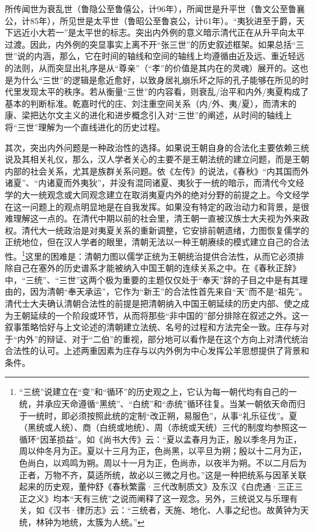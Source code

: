 \documentclass[a4paper, 12pt, openright]{ctexbook}
\begin{document}
所传闻世为衰乱世（鲁隐公至鲁僖公，计96年），所闻世是升平世（鲁文公至鲁襄公，计85年），所见世是太平世（鲁昭公至鲁哀公，计61年）。“夷狄进至于爵，天下远近小大若一”是太平世的标志。突出内外例的意义暗示清代正在从升平向太平过渡。因此，内外例的突显事实上离不开“张三世”的历史叙述框架。如果总括“三世”说的内涵，那么，它在时间的轴线和空间的轴线上均遵循由近及远、重近轻远的法则，从而突显出礼序是从“尊亲”（“孝”的价值是其内在的灵魂）展开的。这也是为什么“三世”的逻辑是愈近愈好，以致身居礼崩乐坏之际的孔子能够在所见的时代里发现太平的秩序。若从衡量“三世”的内容看，则衰乱/治平和内外/夷夏构成了基本的判断标准。乾嘉时代的庄、刘注重空间关系（内/外、夷/夏），而清末的康、梁把达尔文主义的进化和进步概念引入对“三世”的阐述，从时间的轴线上将“三世”理解为一个直线进化的历史过程。

其次，突出内外问题是一种政治性的选择。如果说王朝自身的合法化主要依赖三统说及其相关礼仪，那么，汉人学者关心的主要不是王朝法统的建立问题，而是王朝内部的社会关系，尤其是族群关系问题。依《左传》的说法，《春秋》“内其国而外诸夏”、“内诸夏而外夷狄”，并没有混同诸夏、夷狄于一统的暗示，而清代今文经学的大一统观念或大同观念建立在取消夷夏内外的绝对分野的前提之上。今文经学在这一问题上的观点明显地是在自我发挥。如果没有特定的政治动力和背景，是很难理解这一点的。在清代中期以前的社会里，清王朝一直被汉族士大夫视为外来政权。清代大一统政治是对夷夏关系的重新调整，它安排前朝遗绪，力图恢复儒学的正统地位，但在汉人学者的眼里，清朝无法以一种王朝赓续的模式建立自己的合法性。\footnote{“三统”说建立在“变”和“循环”的历史观之上，它认为每一朝代均有自己的一统，并承应天命遵循“黑统”、“白统”和“赤统”循环往复。当某一朝依天命而归于一统时，即必须按照此统的定制“改正朔，易服色”，从事“礼乐征伐”。夏（黑统或人统）、商（白统或地统）、周（赤统或天统）三代的制度均参照这一循环“因革损益”。如《尚书大传》云：“夏以孟春月为正，殷以季冬月为正，周以仲冬月为正。夏以十三月为正，色尚黑，以平旦为朔；殷以十二月为正，色尚白，以鸡鸣为朔。周以十一月为正，色尚赤，以夜半为朔。不以二月后为正者，万物不齐，莫适所统，故必以三微之月也。”这是一种把统系与因革关联起来的历史观，董仲舒《春秋繁露·三代改制质文》及东汉《白虎通·三正三正之义》均本“天有三统”之说而阐释了这一观念。另外，三统说又与乐理有关，如《汉书·律历志》云：“三统者，天施、地化、人事之纪也。故黄钟为天统，林钟为地统，太簇为人统。”}这里的困难是：清朝力图以儒学正统为王朝统治提供合法性，从而它必须排除自己在塞外的历史谱系才能被纳入中国王朝的连续关系之中。在《春秋正辞》中，“三统”、“三世”这两个极为重要的主题仅仅处于“奉天”辞的子目之中是有其理由的，因为清朝“奉天承运”，它作为“新王”的合法性首先来自“天”而不是“祖先”。清代士大夫确认清朝合法性的前提是把清朝纳入中国王朝延续的历史内部、使之成为王朝延续的一个阶段或环节，从而将那些“非中国的”部分排除在叙述之外。这一叙事策略恰好与上文论述的清朝建立法统、名号的过程和方法完全一致。庄存与对于“内外”的辩证、对于“二伯”的重视，部分地可以看作是在这个方向上对清代统治合法性的认可。上述两重因素为庄存与以内外例为中心发挥公羊思想提供了背景和条件。
\end{document}
